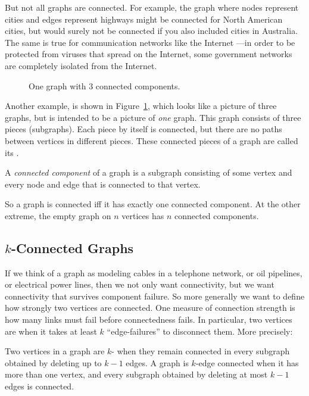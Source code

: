 But not all graphs are connected.  For example, the graph where nodes
represent cities and edges represent highways might be connected for
North American cities, but would surely not be connected if you also
included cities in Australia.  The same is true for communication
networks like the Internet ---in order to be protected from viruses
that spread on the Internet, some government networks are completely
isolated from the Internet.

\begin{figure}[htbp]


\caption{One graph with 3 connected components.}

\label{fig:3comp}
\end{figure}

Another example, is shown in Figure~\ref{fig:3comp}, which looks like a
picture of three graphs, but is intended to be a picture of \emph{one}
graph.  This graph consists of three pieces (subgraphs).  Each piece
by itself is connected, but there are no paths between vertices in
different pieces.  These connected pieces of a graph are called its
.

\begin{definition}\label{def:connected-component}
A \emph{connected component} of a graph is a subgraph consisting of
some vertex and every node and edge that is connected to that vertex.
\end{definition}

So a graph is connected iff it has exactly one connected component.
At the other extreme, the empty graph on $n$ vertices has $n$
connected components.

\subsection{$k$-Connected Graphs}

If we think of a graph as modeling cables in a telephone network, or
oil pipelines, or electrical power lines, then we not only want
connectivity, but we want connectivity that survives component
failure.  So more generally we want to define how strongly two
vertices are connected.  One measure of connection strength is how
many links must fail before connectedness fails.  In particular, two
vertices are  when it takes at least $k$
``edge-failures'' to disconnect them.  More precisely:

\begin{definition}\label{def:k-connected}
Two vertices in a graph are $k$- when they remain
connected in every subgraph obtained by deleting up to $k-1$ edges.  A
graph is $k$-edge
connected when it has
more than one vertex, and every subgraph obtained by deleting at most
$k-1$ edges is connected.
\end{definition}
\iffalse
every two of its vertices are $k$-edge connected.
\fi

